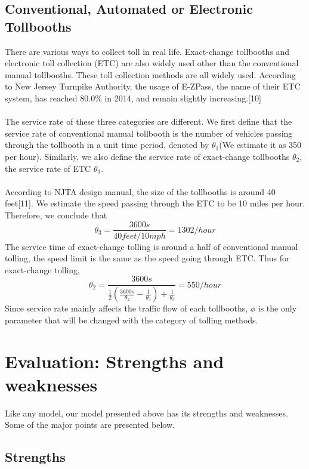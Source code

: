 \subsection{Conventional, Automated or Electronic Tollbooths}
There are various ways to collect toll in real life. Exact-change tollbooths and electronic toll collection (ETC) are also widely used other than the conventional manual tollbooths. These toll collection methods are all widely used. According to New Jersey Turnpike Authority, the usage of E-ZPass, the name of their ETC system, has reached 80.0\% in 2014, and remain slightly increasing.[10]\\
\\
The service rate of these three categories are different. We first define that the service rate of conventional manual tollbooth is the number of vehicles passing through the tollbooth in a unit time period, denoted by $\theta_{1}$(We estimate it as 350 per hour). Similarly, we also define the service rate of exact-change tollbooths $\theta_{2}$, the service rate of ETC $\theta_{3}$.\\
\\
According to NJTA design manual, the size of the tollbooths is around 40 feet[11]. We estimate the speed passing through the ETC to be 10 miles per hour. Therefore, we conclude that\\
\[
\theta_{3} = \frac{3600s}{40feet/10mph} = 1302/hour
\]
The service time of exact-change tolling is around a half of conventional manual tolling, the speed limit is the same as the speed going through ETC. Thus for exact-change tolling,\\
\[
\theta_{2} = \frac{3600s}{\frac{1}{2}(\frac{3600s}{\theta_{2}}-\frac{1}{\theta_{3}})+\frac{1}{\theta_{3}}} = 550 /hour
\]
Since service rate mainly affects the traffic flow of each tollbooths, $\phi$ is the only parameter that will be changed with the category of tolling methods.

\section{Evaluation: Strengths and weaknesses}
Like any model, our model presented above has its strengths and weaknesses. Some of the major points are presented below.

\subsection{Strengths}

